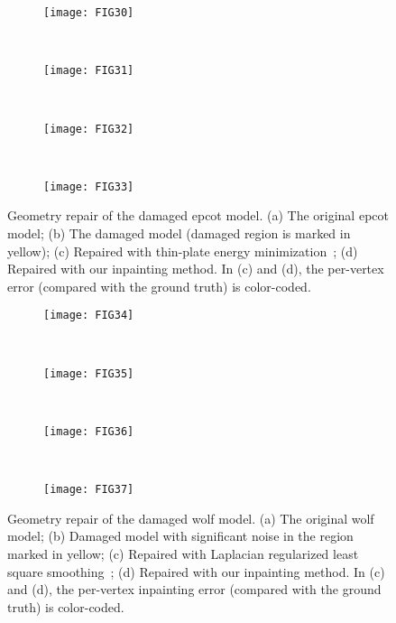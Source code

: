 \begin{figure}
    \centering
    \begin{subfigure}[b]{0.23\linewidth}
        \texttt{[image: FIG30]}
        \caption{}
    \end{subfigure}%
    ~
    \begin{subfigure}[b]{0.23\linewidth}
        \texttt{[image: FIG31]}
        \caption{}
    \end{subfigure}
    ~
    \begin{subfigure}[b]{0.23\linewidth}
        \texttt{[image: FIG32]}
        \caption{}
    \end{subfigure}
    ~
    \begin{subfigure}[b]{0.23\linewidth}
        \texttt{[image: FIG33]}
        \caption{}
    \end{subfigure}
    \caption[Geometry repair of the damaged epcot model.] 
    {Geometry repair of the damaged epcot model. (a) The original epcot model;
    (b) The damaged model (damaged region is marked in yellow); (c) Repaired with thin-plate
    energy minimization~\cite{Bac2008}; (d) Repaired with our inpainting method. In (c) and (d),
    the per-vertex error (compared with the ground truth) is color-coded. }
\label{fig:repair:epcot}
\end{figure}

\begin{figure}
    \centering
    \begin{subfigure}[b]{0.35\linewidth}
        \texttt{[image: FIG34]}
        \caption{}
    \end{subfigure}%
    ~
    \begin{subfigure}[b]{0.35\linewidth}
        \texttt{[image: FIG35]}
        \caption{}
    \end{subfigure}
    \\
    \begin{subfigure}[b]{0.35\linewidth}
        \texttt{[image: FIG36]}
        \caption{}
    \end{subfigure}
    ~
    \begin{subfigure}[b]{0.35\linewidth}
        \texttt{[image: FIG37]}
        \caption{}
    \end{subfigure}
    \caption[Geometry repair of the damaged wolf model.]
    {Geometry repair of the damaged wolf model.
         (a) The original wolf model; (b) Damaged model with significant noise in the region marked in yellow;
         (c) Repaired with Laplacian regularized least square smoothing~\cite{Nealen2006};
         (d) Repaired with our inpainting method. In (c) and (d), the per-vertex inpainting error (compared with the ground truth)
          is color-coded. }
\label{fig:repair:wolf}
\end{figure}

